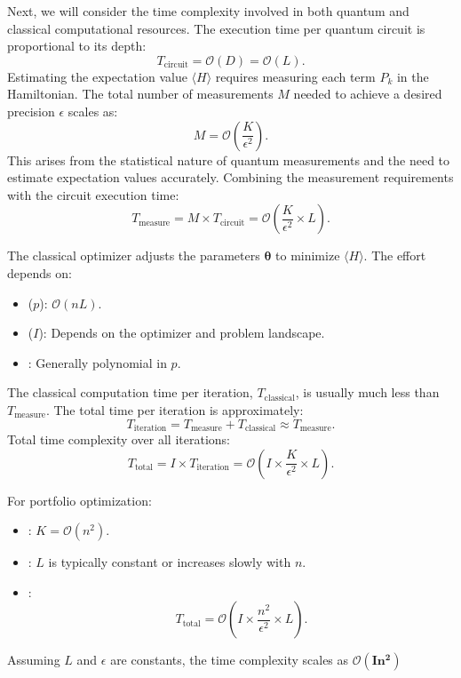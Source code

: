 \documentclass[%
 reprint,
 amsmath,amssymb,
 aps,
]{revtex4-2}
\begin{document}
Next, we will consider the time complexity involved in  both quantum and classical computational resources. The execution time per quantum circuit is proportional to its depth:
\begin{equation}
T_{\text{circuit}} = \mathcal{O}(D) = \mathcal{O}(L).
\end{equation}
Estimating the expectation value $\langle H \rangle$ requires measuring each term $P_k$ in the Hamiltonian. The total number of measurements $M$ needed to achieve a desired precision $\epsilon$ scales as:
\begin{equation}
M = \mathcal{O}\left( \frac{K}{\epsilon^2} \right).
\end{equation}
This arises from the statistical nature of quantum measurements and the need to estimate expectation values accurately. Combining the measurement requirements with the circuit execution time:
\begin{equation}
T_{\text{measure}} = M \times T_{\text{circuit}} = \mathcal{O}\left( \frac{K}{\epsilon^2} \times L \right).
\end{equation}

The classical optimizer adjusts the parameters $\boldsymbol{\theta}$ to minimize $\langle H \rangle$. The effort depends on:
\begin{itemize}
    \item {} ($p$): $\mathcal{O}(nL)$.
    \item {} ($I$): Depends on the optimizer and problem landscape.
    \item {}: Generally polynomial in $p$.
\end{itemize}
The classical computation time per iteration, $T_{\text{classical}}$, is usually much less than $T_{\text{measure}}$. The total time per iteration is approximately:
\begin{equation}
T_{\text{iteration}} = T_{\text{measure}} + T_{\text{classical}} \approx T_{\text{measure}}.
\end{equation}
Total time complexity over all iterations:
\begin{equation}
T_{\text{total}} = I \times T_{\text{iteration}} = \mathcal{O}\left( I \times \frac{K}{\epsilon^2} \times L \right).
\end{equation}

For portfolio optimization:
\begin{itemize}
    \item {}: $K = \mathcal{O}(n^2)$.
    \item {}: $L$ is typically constant or increases slowly with $n$.
    \item {}:
    \begin{equation}
    T_{\text{total}} = \mathcal{O}\left( I \times \frac{n^2}{\epsilon^2} \times L \right).
    \end{equation}
\end{itemize}
Assuming $L$ and $\epsilon$ are constants, the time complexity scales as $\boldsymbol{\mathcal{O}(I n^2)}$
\end{document}
